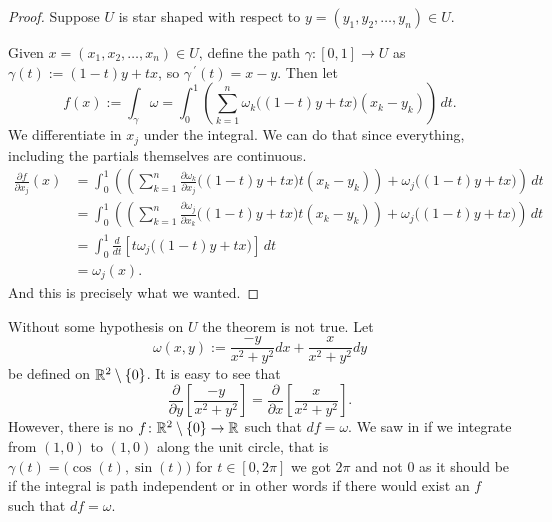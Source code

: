 \begin{proof}
Suppose $U$ is star shaped with respect to $y=(y_1,y_2,\ldots,y_n) \in U$.

Given $x = (x_1,x_2,\ldots,x_n) \in U$, define the path $\gamma \colon [0,1] \to U$ as
$\gamma(t) := (1-t)y + tx$, so $\gamma^{\:\prime}(t) = x-y$.  Then let
\begin{equation*}
f(x) := \int_{\gamma} \omega
=
\int_0^1
\left(
\sum_{k=1}^n
\omega_k \bigl((1-t)y + tx \bigr) (x_k-y_k)
\right) \, dt .
\end{equation*}
We differentiate in $x_j$ under the integral.  We can do that since
everything, including the partials themselves are continuous.
\begin{equation*}
\begin{split}
\frac{\partial f}{\partial x_j}(x) & =
\int_0^1
\left(
\left(
\sum_{k=1}^n
\frac{\partial \omega_k}{\partial x_j} \bigl((1-t)y + tx \bigr) t
(x_k-y_k)
\right)
+
\omega_j \bigl((1-t)y + tx \bigr)
\right)
 \, dt
\\
& = 
\int_0^1
\left(
\left(
\sum_{k=1}^n
\frac{\partial \omega_j}{\partial x_k} \bigl((1-t)y + tx \bigr) t
(x_k-y_k)
\right)
+
\omega_j \bigl((1-t)y + tx \bigr)
\right) \, dt
\\
& = 
\int_0^1
\frac{d}{dt}
\left[
t \omega_j\bigl((1-t)y + tx \bigr)
\right]
\,
dt
\\
&= \omega_j(x) .
\end{split}
\end{equation*}
And this is precisely what we wanted.
\end{proof}

\begin{example}
Without some hypothesis on $U$ the theorem is not true.  Let
\begin{equation*}
\omega(x,y) := \frac{-y}{x^2+y^2} dx + \frac{x}{x^2+y^2} dy
\end{equation*}
be defined on ${\mathbb{R}}^2 \setminus \{ 0 \}$.  It is easy to see that
\begin{equation*}
\frac{\partial}{\partial y} \left[ 
\frac{-y}{x^2+y^2} \right] =
\frac{\partial}{\partial x} \left[ 
\frac{x}{x^2+y^2} \right] .
\end{equation*}
However, there is no $f \colon {\mathbb{R}}^2 \setminus \{ 0 \} \to {\mathbb{R}}$ such that 
$df = \omega$.  We saw in 
 if we integrate from $(1,0)$ to $(1,0)$
along the unit circle, that is $\gamma(t) = \bigl(\cos(t),\sin(t)\bigr)$
for $t \in [0,2\pi]$ we got $2\pi$ and not 0 as it should be if the integral
is path independent or in other words if there would exist an $f$ such that
$df = \omega$.
\end{example}

